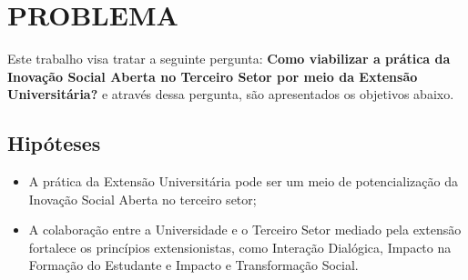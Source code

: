 \section{PROBLEMA}
\label{problema}

Este trabalho visa tratar a seguinte pergunta: \textbf{Como viabilizar a prática da Inovação Social Aberta no Terceiro Setor por meio da Extensão Universitária?} e através dessa pergunta, são apresentados os objetivos abaixo.

\subsection{Hipóteses}
\label{hipoteses}

\begin{itemize}
    \item A prática da Extensão Universitária pode ser um meio de potencialização da Inovação Social Aberta no terceiro setor;
    \item A colaboração entre a Universidade e o Terceiro Setor mediado pela extensão fortalece os princípios extensionistas, como Interação Dialógica, Impacto na Formação do Estudante e Impacto e Transformação Social.

\end{itemize}